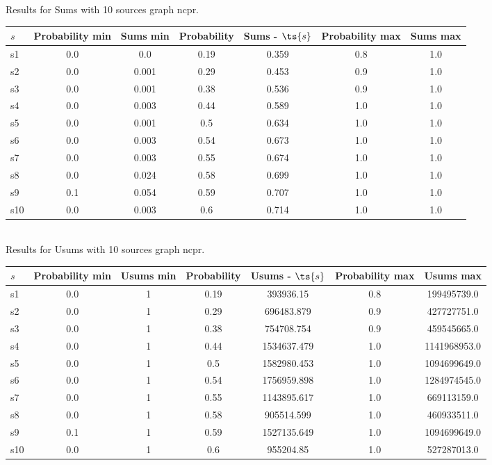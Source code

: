 \documentclass{article}
\begin{document}
\noindent Results for Sums with 10 sources graph ncpr.

\noindent\begin{tabular}{|l|c|c|c|c|c|c|}
\hline
$s$& Probability min & Sums min & Probability & Sums - $\ts{s}$ & Probability max & Sums max\\
\hline
s1 &0.0 & 0.0 & 0.19 & 0.359 & 0.8 & 1.0\\
\hline
s2 &0.0 & 0.001 & 0.29 & 0.453 & 0.9 & 1.0\\
\hline
s3 &0.0 & 0.001 & 0.38 & 0.536 & 0.9 & 1.0\\
\hline
s4 &0.0 & 0.003 & 0.44 & 0.589 & 1.0 & 1.0\\
\hline
s5 &0.0 & 0.001 & 0.5 & 0.634 & 1.0 & 1.0\\
\hline
s6 &0.0 & 0.003 & 0.54 & 0.673 & 1.0 & 1.0\\
\hline
s7 &0.0 & 0.003 & 0.55 & 0.674 & 1.0 & 1.0\\
\hline
s8 &0.0 & 0.024 & 0.58 & 0.699 & 1.0 & 1.0\\
\hline
s9 &0.1 & 0.054 & 0.59 & 0.707 & 1.0 & 1.0\\
\hline
s10 &0.0 & 0.003 & 0.6 & 0.714 & 1.0 & 1.0\\
\hline
\end{tabular}\\

\noindent Results for Usums with 10 sources graph ncpr.

\noindent\begin{tabular}{|l|c|c|c|c|c|c|}
\hline
$s$& Probability min & Usums min & Probability & Usums - $\ts{s}$ & Probability max & Usums max\\
\hline
s1 &0.0 & 1 & 0.19 & 393936.15 & 0.8 & 199495739.0\\
\hline
s2 &0.0 & 1 & 0.29 & 696483.879 & 0.9 & 427727751.0\\
\hline
s3 &0.0 & 1 & 0.38 & 754708.754 & 0.9 & 459545665.0\\
\hline
s4 &0.0 & 1 & 0.44 & 1534637.479 & 1.0 & 1141968953.0\\
\hline
s5 &0.0 & 1 & 0.5 & 1582980.453 & 1.0 & 1094699649.0\\
\hline
s6 &0.0 & 1 & 0.54 & 1756959.898 & 1.0 & 1284974545.0\\
\hline
s7 &0.0 & 1 & 0.55 & 1143895.617 & 1.0 & 669113159.0\\
\hline
s8 &0.0 & 1 & 0.58 & 905514.599 & 1.0 & 460933511.0\\
\hline
s9 &0.1 & 1 & 0.59 & 1527135.649 & 1.0 & 1094699649.0\\
\hline
s10 &0.0 & 1 & 0.6 & 955204.85 & 1.0 & 527287013.0\\
\hline
\end{tabular}\\
\end{document}
